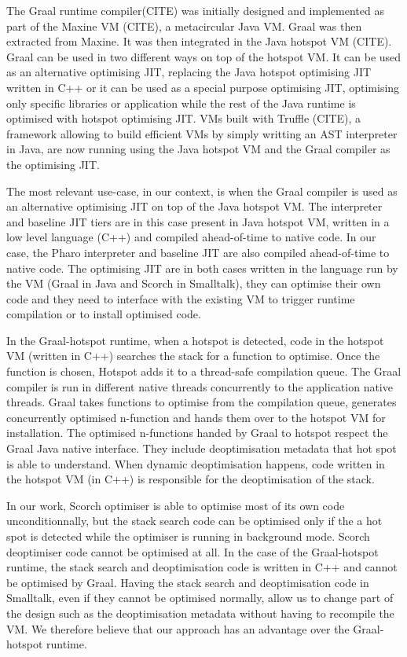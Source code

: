 \documentclass[a4paper,12pt,twoside]{../includes/ThesisStyle}
\begin{document}
The Graal runtime compiler(CITE) was initially designed and implemented as part of the Maxine VM (CITE), a metacircular Java VM. Graal was then extracted from Maxine. It was then integrated in the Java hotspot VM (CITE). Graal can be used in two different ways on top of the hotspot VM. It can be used as an alternative optimising JIT, replacing the Java hotspot optimising JIT written in C++ or it can be used as a special purpose optimising JIT, optimising only specific libraries or application while the rest of the Java runtime is optimised with hotspot optimising JIT. VMs built with Truffle (CITE), a framework allowing to build efficient VMs by simply writting an AST interpreter in Java, are now running using the Java hotspot VM and the Graal compiler as the optimising JIT.

The most relevant use-case, in our context, is when the Graal compiler is used as an alternative optimising JIT on top of the Java hotspot VM. The interpreter and baseline JIT tiers are in this case present in Java hotspot VM, written in a low level language (C++) and compiled ahead-of-time to native code. In our case, the Pharo interpreter and baseline JIT are also compiled ahead-of-time to native code. The optimising JIT are in both cases written in the language run by the VM (Graal in Java and Scorch in Smalltalk), they can optimise their own code and they need to interface with the existing VM to trigger runtime compilation or to install optimised code.

In the Graal-hotspot runtime, when a hotspot is detected, code in the hotspot VM (written in C++) searches the stack for a function to optimise. Once the function is chosen, Hotspot adds it to a thread-safe compilation queue. The Graal compiler is run in different native threads concurrently to the application native threads. Graal takes functions to optimise from the compilation queue, generates concurrently optimised n-function and hands them over to the hotspot VM for installation. The optimised n-functions handed by Graal to hotspot respect the Graal Java native interface. They include deoptimisation metadata that hot spot is able to understand. When dynamic deoptimisation happens, code written in the hotspot VM (in C++) is responsible for the deoptimisation of the stack.

In our work, Scorch optimiser is able to optimise most of its own code unconditionnally, but the stack search code can be optimised only if the a hot spot is detected while the optimiser is running in background mode. Scorch deoptimiser code cannot be optimised at all. In the case of the Graal-hotspot runtime, the stack search and deoptimisation code is written in C++ and cannot be optimised by Graal. Having the stack search and deoptimisation code in Smalltalk, even if they cannot be optimised normally, allow us to change part of the design such as the deoptimisation metadata without having to recompile the VM. We therefore believe that our approach has an advantage over the Graal-hotspot runtime.
\end{document}
